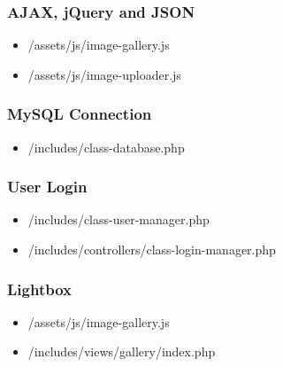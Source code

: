 \documentclass[a4paper,12pt,oneside]{article} %
\begin{document}
\subsubsection{AJAX, jQuery and JSON}

\begin{itemize}
\item /assets/js/image-gallery.js
\item /assets/js/image-uploader.js
\end{itemize}


\subsubsection{MySQL Connection}

\begin{itemize}
\item /includes/class-database.php
\end{itemize}


\subsubsection{User Login}

\begin{itemize}
\item /includes/class-user-manager.php
\item /includes/controllers/class-login-manager.php
\end{itemize}


\subsubsection{Lightbox}

\begin{itemize}
\item /assets/js/image-gallery.js
\item /includes/views/gallery/index.php
\end{itemize}
\end{document}
